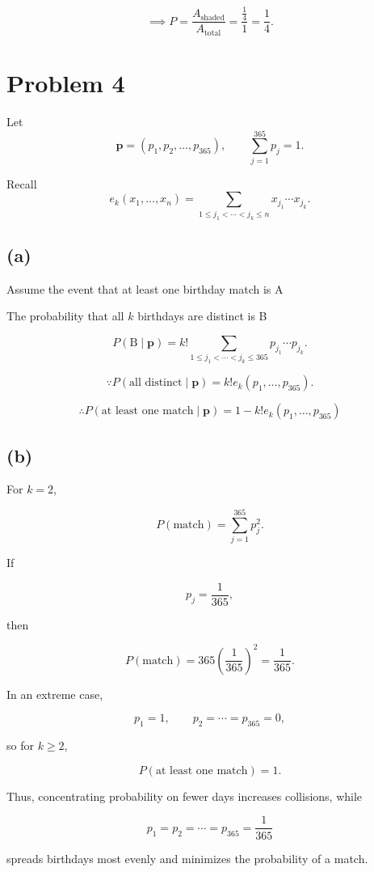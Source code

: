 \documentclass{article}
\begin{document}
\[
\implies
P
=
\frac{A_{\text{shaded}}}{A_{\text{total}}}
=
\frac{\frac14}{1}
=
\frac14.
\]



\section*{Problem 4}

Let
\[
\mathbf p=(p_1,p_2,\ldots,p_{365}),
\qquad
\sum_{j=1}^{365}p_j=1.
\]

Recall
\[
e_k(x_1,\ldots,x_n)
=
\sum_{1\le j_1<\cdots<j_k\le n}
x_{j_1}\cdots x_{j_k}.
\]

\subsection*{(a)}
Assume the event that at least one birthday match is A

The probability that all \(k\) birthdays are distinct is B

\[
P(\text{B}\mid \mathbf p)
=
k!
\sum_{1\le j_1<\cdots<j_k\le365}
p_{j_1}\cdots p_{j_k}.
\]

\[
\because
P(\text{all distinct}\mid \mathbf p)
=
k!e_k(p_1,\ldots,p_{365}).
\]

\[
\therefore
P(\text{at least one match}\mid \mathbf p)
=
1-k!e_k(p_1,\ldots,p_{365})
\]

\subsection*{(b)}

For \(k=2\),

\[
P(\text{match})
=
\sum_{j=1}^{365}p_j^2.
\]

If

\[
p_j=\frac1{365},
\]

then

\[
P(\text{match})
=
365\left(\frac1{365}\right)^2
=
\frac1{365}.
\]

In an extreme case,

\[
p_1=1,\qquad
p_2=\cdots=p_{365}=0,
\]

so for \(k\ge2\),

\[
P(\text{at least one match})=1.
\]

Thus, concentrating probability on fewer days increases collisions, while

\[
p_1=p_2=\cdots=p_{365}=\frac1{365}
\]

spreads birthdays most evenly and minimizes the probability of a match.
\end{document}
